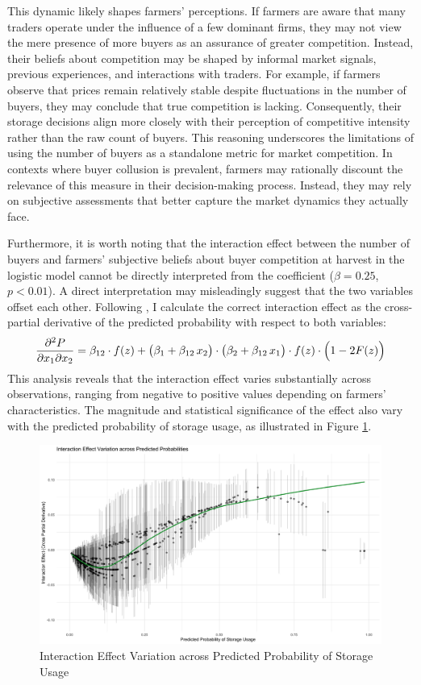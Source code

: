\documentclass[12pt]{article}
\begin{document}
This dynamic likely shapes farmers' perceptions. If farmers are aware that many traders operate under the influence of a few dominant firms, they may not view the mere presence of more buyers as an assurance of greater competition. Instead, their beliefs about competition may be shaped by informal market signals, previous experiences, and interactions with traders. For example, if farmers observe that prices remain relatively stable despite fluctuations in the number of buyers, they may conclude that true competition is lacking. Consequently, their storage decisions align more closely with their perception of competitive intensity rather than the raw count of buyers. This reasoning underscores the limitations of using the number of buyers as a standalone metric for market competition. In contexts where buyer collusion is prevalent, farmers may rationally discount the relevance of this measure in their decision-making process. Instead, they may rely on subjective assessments that better capture the market dynamics they actually face.

Furthermore, it is worth noting that the interaction effect between the number of buyers and farmers' subjective beliefs about buyer competition at harvest in the logistic model cannot be directly interpreted from the coefficient ($\beta = 0.25$, $p < 0.01$). A direct interpretation may misleadingly suggest that the two variables offset each other. Following \cite{ai2003interaction}, I calculate the correct interaction effect as the cross-partial derivative of the predicted probability with respect to both variables: $$\frac{\partial^2 P}{\partial x_1 \partial x_2} = \beta_{12} \cdot f(z) + \bigl(\beta_1 + \beta_{12} \, x_2\bigr) \cdot \bigl(\beta_2 + \beta_{12} \, x_1\bigr) \cdot f(z) \cdot \Bigl(1 - 2F(z)\Bigr)$$ This analysis reveals that the interaction effect varies substantially across observations, ranging from negative to positive values depending on farmers' characteristics. The magnitude and statistical significance of the effect also vary with the predicted probability of storage usage, as illustrated in Figure \ref{Figure: interaction effects}.

\begin{figure}[ht]
\centering
\includegraphics[width=1\textwidth]{figures/Interaction_Effect_across_Predicted Probabilities.png}
\caption{Interaction Effect Variation across Predicted Probability of Storage Usage}
\label{Figure: interaction effects}
\end{figure}
\end{document}
